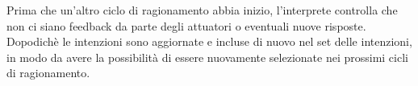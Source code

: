\documentclass[12pt,a4paper,openright,twoside]{report}
\begin{document}

\bigskip
\bigskip

Prima che un'altro ciclo di ragionamento abbia inizio, l'interprete controlla che non ci siano feedback da parte degli attuatori o eventuali nuove risposte. Dopodich\`e le intenzioni sono aggiornate e incluse di nuovo nel set delle intenzioni, in modo da avere la possibilit\`a di essere nuovamente selezionate nei prossimi cicli di ragionamento.



%
%
\end{document}
